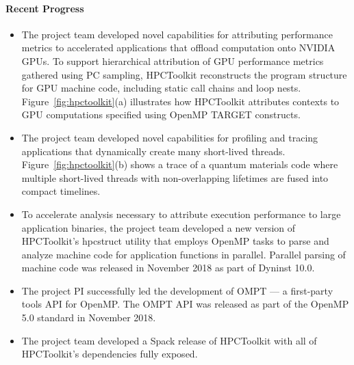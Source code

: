 \paragraph{Recent Progress}

\begin{itemize}

\item
The project team developed novel capabilities for attributing
performance metrics to accelerated applications that offload
computation onto NVIDIA GPUs.  To support hierarchical attribution of
GPU performance metrics gathered using PC sampling, HPCToolkit
reconstructs the program structure for GPU machine code, including
static call chains and loop nests.
Figure~\ref{fig:hpctoolkit}(a) illustrates how HPCToolkit attributes
contexts to GPU computations specified using OpenMP TARGET constructs.

\item
The project team developed novel capabilities for profiling and
tracing applications that dynamically create many short-lived
threads. Figure~\ref{fig:hpctoolkit}(b) shows a trace of a
quantum materials code where multiple short-lived threads with
non-overlapping lifetimes are fused into compact timelines.

 \item 
To accelerate analysis necessary to attribute execution
performance to large application binaries, the project team developed
a new version of HPCToolkit's hpcstruct utility that employs OpenMP
tasks to parse and analyze machine code for application functions in
parallel. Parallel parsing of machine code was released in November
2018 as part of Dyninst 10.0.

\item
The project PI successfully led the development of OMPT --- a
first-party tools API for OpenMP. The OMPT API was released as part of
the OpenMP 5.0 standard in November 2018.

\item 
The project team developed a Spack release of HPCToolkit with all of
HPCToolkit's dependencies fully exposed.

\end{itemize}

